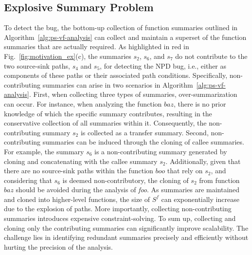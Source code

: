 \subsection{Explosive Summary Problem}
To detect the bug, the bottom-up collection of function summaries outlined in Algorithm~\ref{alg:ps-vf-analysis} can collect and maintain a superset of the function summaries that are actually required.
As highlighted in red in Fig.~\ref{fig:motivation_ex}(c), the summaries $s_2$, $s_6$, and $s_7$ do not contribute to the two source-sink paths, $s_{4}$ and $s_{5}$, for detecting the NPD bug, i.e., either as components of these paths or their associated path conditions.
Specifically, non-contributing summaries can arise in two scenarios in Algorithm~\ref{alg:ps-vf-analysis}.
First, when collecting three types of summaries, over-summarization can occur.
For instance,
when analyzing the function $baz$, there is no prior knowledge of which the specific summary contributes, resulting in the conservative collection of all summaries within it.
Consequently, the non-contributing summary $s_2$ is collected as a transfer summary.
Second, non-contributing summaries can be induced through the cloning of callee summaries. 
For example, the summary $s_6$ is a non-contributing summary generated by cloning and concatenating with the callee summary $s_2$. 
Additionally, given that there are no source-sink paths within the function $boo$ that rely on $s_2$, and considering that $s_6$ is deemed non-contributory, the cloning of $s_2$ from function $baz$ should be avoided during the analysis of \textit{foo}.
As summaries are maintained and cloned into higher-level functions, the size of $S^f$ can exponentially increase due to the explosion of paths.
More importantly, collecting non-contributing summaries introduces expensive constraint-solving.
To sum up, collecting and cloning only the contributing summaries can significantly improve scalability.
The challenge lies in identifying redundant summaries precisely and efficiently without hurting the precision of the analysis.


